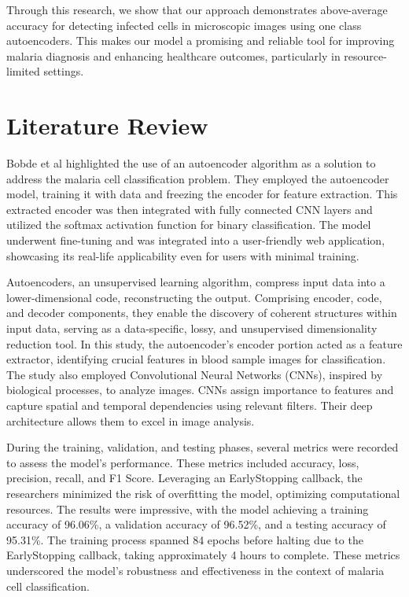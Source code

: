 \documentclass[journal,12pt,onecolumn,draftcls]{IEEEtran}
\begin{document}
Through this research, we show that our approach demonstrates above-average accuracy for detecting infected cells in microscopic images using one class autoencoders. This makes our model a promising and reliable tool for improving malaria diagnosis and enhancing healthcare outcomes, particularly in resource-limited settings.

\section{Literature Review}
Bobde et al \cite{bobde2022} highlighted the use of an autoencoder algorithm as a solution to address the malaria cell classification problem. They employed the autoencoder model, training it with data and freezing the encoder for feature extraction. This extracted encoder was then integrated with fully connected CNN layers and utilized the softmax activation function for binary classification. The model underwent fine-tuning and was integrated into a user-friendly web application, showcasing its real-life applicability even for users with minimal training.

Autoencoders, an unsupervised learning algorithm, compress input data into a lower-dimensional code, reconstructing the output. Comprising encoder, code, and decoder components, they enable the discovery of coherent structures within input data, serving as a data-specific, lossy, and unsupervised dimensionality reduction tool. In this study, the autoencoder's encoder portion acted as a feature extractor, identifying crucial features in blood sample images for classification. The study also employed Convolutional Neural Networks (CNNs), inspired by biological processes, to analyze images. CNNs assign importance to features and capture spatial and temporal dependencies using relevant filters. Their deep architecture allows them to excel in image analysis.

During the training, validation, and testing phases, several metrics were recorded to assess the model's performance. These metrics included accuracy, loss, precision, recall, and F1 Score. Leveraging an EarlyStopping callback, the researchers minimized the risk of overfitting the model, optimizing computational resources. The results were impressive, with the model achieving a training accuracy of 96.06\%, a validation accuracy of 96.52\%, and a testing accuracy of 95.31\%. The training process spanned 84 epochs before halting due to the EarlyStopping callback, taking approximately 4 hours to complete. These metrics underscored the model's robustness and effectiveness in the context of malaria cell classification.
\end{document}
